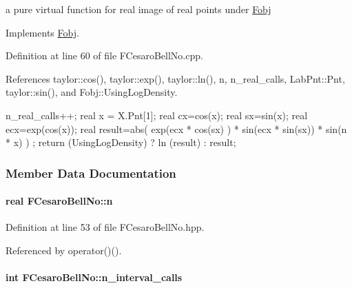 a pure virtual function for real image of real points under \hyperlink{classFobj}{\-Fobj} 



\-Implements \hyperlink{classFobj_a7e89aa4918cf8e40683dde607257d1ee}{\-Fobj}.



\-Definition at line 60 of file \-F\-Cesaro\-Bell\-No.\-cpp.



\-References taylor\-::cos(), taylor\-::exp(), taylor\-::ln(), n, n\-\_\-real\-\_\-calls, \-Lab\-Pnt\-::\-Pnt, taylor\-::sin(), and \-Fobj\-::\-Using\-Log\-Density.


\begin{DoxyCode}
     {
       n_real_calls++;
       real x = X.Pnt[1];
       real cx=cos(x);
       real sx=sin(x);
       real ecx=exp(cos(x));
       real result=abs( exp(ecx * cos(sx) ) * sin(ecx * sin(sx)) * sin(n * x) )
      ;
       return (UsingLogDensity) ? ln (result) : result;
     }
\end{DoxyCode}


\subsubsection{\-Member \-Data \-Documentation}
\hypertarget{classFCesaroBellNo_ad4a60a8d228991378abcba98a90df97c}{
\paragraph[{n}]{\setlength{\rightskip}{0pt plus 5cm}real {\bf \-F\-Cesaro\-Bell\-No\-::n}}}\label{classFCesaroBellNo_ad4a60a8d228991378abcba98a90df97c}


\-Definition at line 53 of file \-F\-Cesaro\-Bell\-No.\-hpp.



\-Referenced by operator()().

\hypertarget{classFCesaroBellNo_a9b66171468efcbb22ffb4e9fba7759e4}{
\paragraph[{n\-\_\-interval\-\_\-calls}]{\setlength{\rightskip}{0pt plus 5cm}int {\bf \-F\-Cesaro\-Bell\-No\-::n\-\_\-interval\-\_\-calls}}}\label{classFCesaroBellNo_a9b66171468efcbb22ffb4e9fba7759e4}


